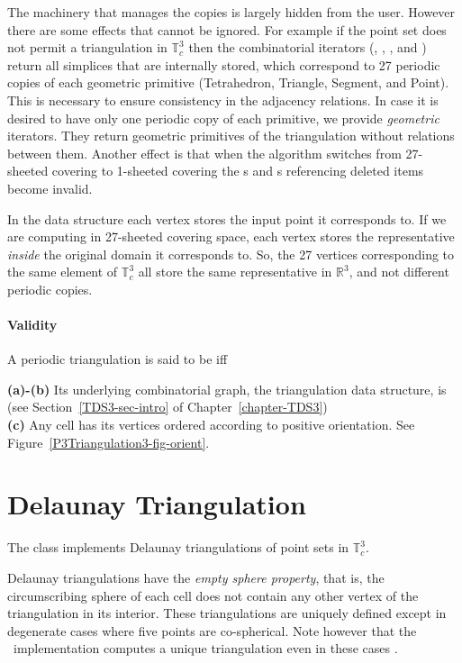 The machinery that manages the copies is largely hidden from the
user. However there are some effects that cannot be ignored. For
example if the point set does not permit a triangulation in $\mathbb
T_c^3$ then the combinatorial iterators (,
, , and )
return all simplices that are internally stored, which correspond to
27 periodic copies of each geometric primitive (Tetrahedron, Triangle,
Segment, and Point). This is necessary to ensure consistency in the
adjacency relations. In case it is desired to have only one periodic
copy of each primitive, we provide \emph{geometric} iterators. They
return geometric primitives of the triangulation without relations
between them. Another effect is that when the algorithm switches from
27-sheeted covering to 1-sheeted covering the s and
s referencing deleted items become invalid.

In the data structure each vertex stores the input point it
corresponds to. If we are computing in 27-sheeted covering 
space, each vertex stores the representative \emph{inside} the
original domain it corresponds to. So, the 27 vertices corresponding
to the same element of $\mathbb T_c^3$ all store the same
representative in $\mathbb R^3$, and not different periodic copies.

\paragraph{Validity}
A periodic triangulation is said to be  iff

{\bf (a)-(b)} Its underlying combinatorial graph, the triangulation
data structure, is  
(see Section~\ref{TDS3-sec-intro} of Chapter~\ref{chapter-TDS3})\\
{\bf (c)} Any cell has its vertices ordered according to positive
orientation. See Figure~\ref{P3Triangulation3-fig-orient}.

\section{Delaunay Triangulation} 
The class  implements Delaunay
triangulations of point sets in $\mathbb T_c^3$.

Delaunay triangulations have the \textit{empty sphere property},
that is, the circumscribing sphere of each cell does not contain any
other vertex of the triangulation in its interior. These
triangulations are uniquely defined except in degenerate cases where
five points are co-spherical.  Note however that the \cgal\
implementation computes a unique triangulation even in these cases
\cite{cgal:dt-pvr3d-03}.

